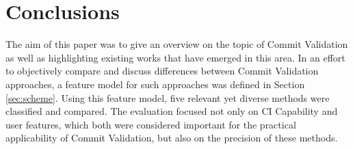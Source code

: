 \section{Conclusions}
\label{sec:conclusions}




The aim of this paper was to give an overview on the topic of Commit Validation as well as highlighting existing works that have emerged in this area. In an effort to objectively compare and discuss differences between Commit Validation approaches, a feature model for such approaches was defined in Section \ref{sec:scheme}. Using this feature model, five relevant yet diverse methods were classified and compared. The evaluation focused not only on CI Capability and user features, which both were considered important for the practical applicability of Commit Validation, but also on the precision of these methods.


